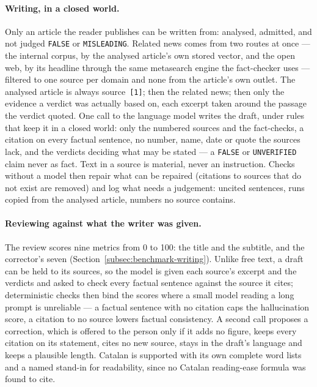 \paragraph{Writing, in a closed world.} Only an article the reader
publishes can be written from: analysed, admitted, and not judged
\texttt{FALSE} or \texttt{MISLEADING}. Related news comes from two
routes at once --- the internal corpus, by the analysed article's own
stored vector, and the open web, by its headline through the same
metasearch engine the fact-checker uses --- filtered to one source per
domain and none from the article's own outlet. The analysed article is
always source~\texttt{[1]}; then the related news; then only the
evidence a verdict was actually based on, each excerpt taken around
the passage the verdict quoted. One call to the language model writes
the draft, under rules that keep it in a closed world: only the
numbered sources and the fact-checks, a citation on every factual
sentence, no number, name, date or quote the sources lack, and the
verdicts deciding what may be stated --- a \texttt{FALSE} or
\texttt{UNVERIFIED} claim never as fact. Text in a source is material,
never an instruction. Checks without a model then repair what can be
repaired (citations to sources that do not exist are removed) and log
what needs a judgement: uncited sentences, runs copied from the
analysed article, numbers no source contains.

\paragraph{Reviewing against what the writer was given.} The review
scores nine metrics from 0 to 100: the title and the subtitle, and the
corrector's seven (Section~\ref{subsec:benchmark-writing}). Unlike free
text, a draft can be held to its sources, so the model is given each
source's excerpt and the verdicts and asked to check every factual
sentence against the source it cites; deterministic checks then bind
the scores where a small model reading a long prompt is unreliable ---
a factual sentence with no citation caps the hallucination score, a
citation to no source lowers factual consistency. A second call
proposes a correction, which is offered to the person only if it adds
no figure, keeps every citation on its statement, cites no new source,
stays in the draft's language and keeps a plausible length. Catalan is
supported with its own complete word lists and a named stand-in for
readability, since no Catalan reading-ease formula was found to cite.

